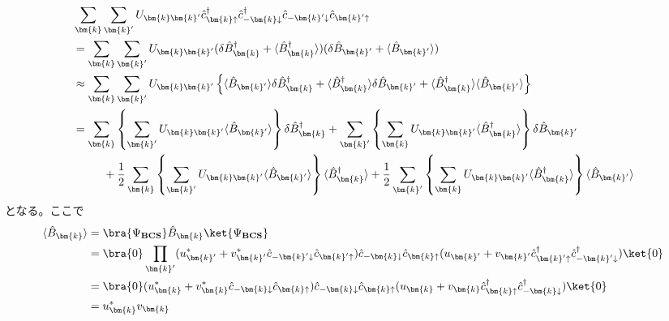 \documentclass[dvipdfmx, 11pt, a4paper]{jsarticle}
\numberwithin{equation}{section}
\theoremstyle{definition}
\begin{document}
    \begin{derivationBox}
        \begin{align}
            &\sum_{\bm{k}}\sum_{\bm{k}'} U_{\bm{k}\bm{k}'} \hat{c}_{\bm{k}\uparrow}^\dagger \hat{c}_{-\bm{k}\downarrow}^\dagger \hat{c}_{-\bm{k}'\downarrow}\hat{c}_{\bm{k}'\uparrow} \notag \\
            &= \sum_{\bm{k}}\sum_{\bm{k}'} U_{\bm{k}\bm{k}'} (\delta \hat{B}_{\bm{k}}^\dagger + \langle \hat{B}_{\bm{k}}^\dagger \rangle )(\delta \hat{B}_{\bm{k}'} + \langle \hat{B}_{\bm{k}'} \rangle) \notag \\
            &\approx \sum_{\bm{k}}\sum_{\bm{k}'} U_{\bm{k}\bm{k}'} \left\{ \langle \hat{B}_{\bm{k}'} \rangle\delta \hat{B}_{\bm{k}}^\dagger  +  \langle \hat{B}_{\bm{k}}^\dagger \rangle \delta \hat{B}_{\bm{k}'} + \langle \hat{B}_{\bm{k}}^\dagger \rangle  \langle \hat{B}_{\bm{k}'} \rangle \right\} \notag \\
            &= \sum_{\bm{k}} \left\{ \sum_{\bm{k}'} U_{\bm{k}\bm{k}'}  \langle \hat{B}_{\bm{k}'} \rangle \right\} \delta \hat{B}_{\bm{k}}^\dagger + \sum_{\bm{k}'} \left\{ \sum_{\bm{k}} U_{\bm{k}\bm{k}'}  \langle \hat{B}_{\bm{k}}^\dagger \rangle \right\} \delta \hat{B}_{\bm{k}'} \notag \\
            &\ \ \ \ \ \ \ \ + \frac{1}{2}\sum_{\bm{k}} \left\{ \sum_{\bm{k}'} U_{\bm{k}\bm{k}'}  \langle \hat{B}_{\bm{k}'} \rangle \right\} \langle \hat{B}_{\bm{k}}^\dagger \rangle + \frac{1}{2}\sum_{\bm{k}'} \left\{ \sum_{\bm{k}} U_{\bm{k}\bm{k}'}\langle \hat{B}_{\bm{k}}^\dagger \rangle \right\}  \langle \hat{B}_{\bm{k}'} \rangle 
        \end{align}
        となる。ここで
        \begin{align}
            \langle \hat{B}_{\bm{k}} \rangle &= \bra{\Psi_{\textbf{BCS}}} \hat{B}_{\bm{k}} \ket{\Psi_{\textbf{BCS}}} \notag \\
            &= \bra{0} \prod_{\bm{k}'} (u_{\bm{k}'}^* + v^*_{\bm{k}'}\hat{c}_{-\bm{k}'\downarrow} \hat{c}_{\bm{k}'\uparrow}) \hat{c}_{-\bm{k}\downarrow}\hat{c}_{\bm{k}\uparrow} (u_{\bm{k}'}+v_{\bm{k}'}\hat{c}_{\bm{k}'\uparrow}^\dagger \hat{c}_{-\bm{k}'\downarrow}^\dagger) \ket{0} \notag \\
            &= \bra{0} (u_{\bm{k}}^* + v^*_{\bm{k}}\hat{c}_{-\bm{k}\downarrow} \hat{c}_{\bm{k}\uparrow}) \hat{c}_{-\bm{k}\downarrow}\hat{c}_{\bm{k}\uparrow} (u_{\bm{k}}+v_{\bm{k}}\hat{c}_{\bm{k}\uparrow}^\dagger \hat{c}_{-\bm{k}\downarrow}^\dagger) \ket{0} \notag \\
            &= u_{\bm{k}}^* v_{\bm{k}} \label{lanBran uv}

\end{align}
\end{derivationBox}
\end{document}
